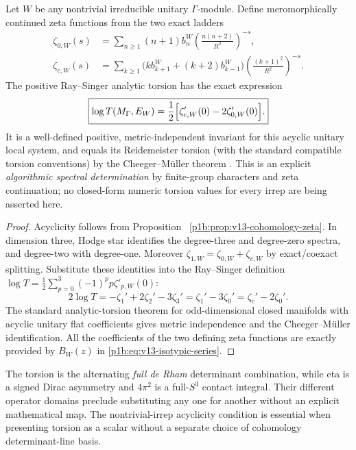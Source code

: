 \documentclass[11pt]{article}
\begin{document}
\begin{theorem}
\label{p1b:thm:v13-torsion-algorithm}
Let $W$ be any nontrivial irreducible unitary $\Gamma$-module.  Define
meromorphically continued zeta functions from the two exact ladders
\begin{align}
 \zeta_{0,W}(s)
 &=\sum_{n\ge1}(n+1)b_n^W
   \left(\frac{n(n+2)}{R^2}\right)^{-s},
 \label{p1b:eq:v13-zeta-scalar}\\
 \zeta_{c,W}(s)
 &=\sum_{k\ge1}
   \bigl(kb_{k+1}^W+(k+2)b_{k-1}^W\bigr)
   \left(\frac{(k+1)^2}{R^2}\right)^{-s}.
 \label{p1b:eq:v13-zeta-coexact}
\end{align}
The positive Ray--Singer analytic torsion has the exact expression
\begin{equation}
\label{p1b:eq:v13-torsion-formula}
 \boxed{\log T(M_\Gamma,E_W)
   =\frac12\Bigl[\zeta_{c,W}'(0)-2\zeta_{0,W}'(0)\Bigr].}
\end{equation}
It is a well-defined positive, metric-independent invariant for
this acyclic unitary local system, and equals its Reidemeister torsion
(with the standard compatible torsion conventions) by the
Cheeger--M\"uller theorem \cite{Mueller1978AnalyticTorsion}.
This is an explicit \emph{algorithmic spectral determination} by
finite-group characters and zeta continuation; no closed-form
numeric torsion values for every irrep are being asserted here.
\end{theorem}
\begin{proof}
Acyclicity follows from Proposition~
\ref{p1b:prop:v13-cohomology-zeta}. In dimension three,
Hodge star identifies the degree-three and degree-zero spectra,
and degree-two with degree-one.  Moreover
$\zeta_{1,W}=\zeta_{0,W}+\zeta_{c,W}$ by exact/coexact splitting.
Substitute these identities into the Ray--Singer definition
$\log T=\frac12\sum_{p=0}^{3}(-1)^p p\zeta'_{p,W}(0)$:
\[
 2\log T=-\zeta_1'+2\zeta_2'-3\zeta_3'
 =\zeta_1'-3\zeta_0'=\zeta_c'-2\zeta_0'.
\]
The standard analytic-torsion theorem for odd-dimensional closed
manifolds with acyclic unitary flat coefficients gives metric
independence and the Cheeger--M\"uller identification.
All the coefficients of the two defining zeta functions are exactly
provided by $B_W(z)$ in \eqref{p1b:eq:v13-isotypic-series}.
\end{proof}

\begin{remark}
\label{p1b:rem:v13-torsion-owner}
The torsion is the alternating \emph{full de Rham} determinant
combination, while eta is a signed Dirac asymmetry and $4\pi^2$
is a full-$S^3$ contact integral. Their different operator domains
preclude substituting any one for another without an explicit
mathematical map.  The nontrivial-irrep acyclicity condition is
essential when presenting torsion as a scalar without a separate
choice of cohomology determinant-line basis.
\end{remark}
\end{document}
